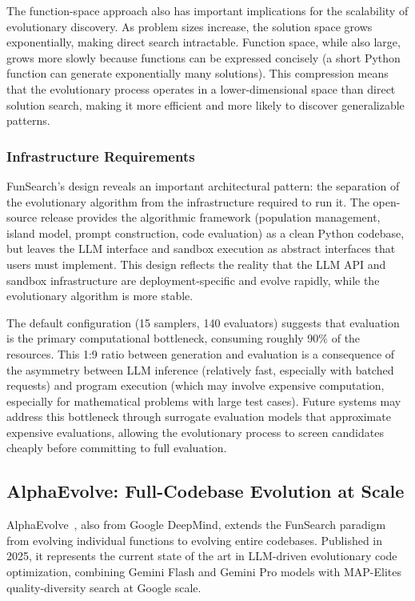 The function-space approach also has important implications for the scalability of evolutionary discovery. As problem sizes increase, the solution space grows exponentially, making direct search intractable. Function space, while also large, grows more slowly because functions can be expressed concisely (a short Python function can generate exponentially many solutions). This compression means that the evolutionary process operates in a lower-dimensional space than direct solution search, making it more efficient and more likely to discover generalizable patterns.

\subsubsection{Infrastructure Requirements}

FunSearch's design reveals an important architectural pattern: the separation of the evolutionary algorithm from the infrastructure required to run it. The open-source release provides the algorithmic framework (population management, island model, prompt construction, code evaluation) as a clean Python codebase, but leaves the LLM interface and sandbox execution as abstract interfaces that users must implement. This design reflects the reality that the LLM API and sandbox infrastructure are deployment-specific and evolve rapidly, while the evolutionary algorithm is more stable.

The default configuration (15 samplers, 140 evaluators) suggests that evaluation is the primary computational bottleneck, consuming roughly 90\% of the resources. This 1:9 ratio between generation and evaluation is a consequence of the asymmetry between LLM inference (relatively fast, especially with batched requests) and program execution (which may involve expensive computation, especially for mathematical problems with large test cases). Future systems may address this bottleneck through surrogate evaluation models that approximate expensive evaluations, allowing the evolutionary process to screen candidates cheaply before committing to full evaluation.

\subsection{AlphaEvolve: Full-Codebase Evolution at Scale}
\label{sec:alphaevolve}

AlphaEvolve~\citep{novikov2025alphaevolve}, also from Google DeepMind, extends the FunSearch paradigm from evolving individual functions to evolving entire codebases. Published in 2025, it represents the current state of the art in LLM-driven evolutionary code optimization, combining Gemini Flash and Gemini Pro models with MAP-Elites quality-diversity search at Google scale.

